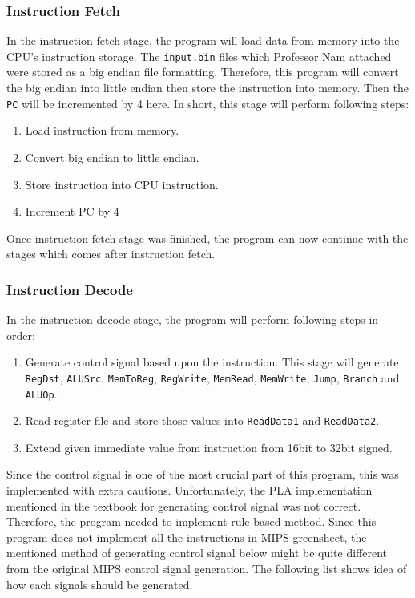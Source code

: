 \documentclass{homework}
\begin{document}
\subsubsection{Instruction Fetch}
In the instruction fetch stage, the program will load data from memory into the CPU's instruction storage. The \texttt{input.bin} files which Professor Nam attached were stored as a big endian file formatting. Therefore, this program will convert the big endian into little endian then store the instruction into memory. Then the \texttt{PC} will be incremented by 4 here. In short, this stage will perform following steps:
\begin{enumerate}
    \item Load instruction from memory.
    \item Convert big endian to little endian.
    \item Store instruction into CPU instruction.
    \item Increment PC by 4
\end{enumerate}
Once instruction fetch stage was finished, the program can now continue with the stages which comes after instruction fetch.
\pagebreak
\subsubsection{Instruction Decode}
In the instruction decode stage, the program will perform following steps in order:
\begin{enumerate}
    \item Generate control signal based upon the instruction. This stage will generate \texttt{RegDst}, \texttt{ALUSrc}, \texttt{MemToReg}, \texttt{RegWrite}, \texttt{MemRead}, \texttt{MemWrite}, \texttt{Jump}, \texttt{Branch} and \texttt{ALUOp}.
    \item Read register file and store those values into \texttt{ReadData1} and \texttt{ReadData2}.
    \item Extend given immediate value from instruction from 16bit to 32bit signed.
\end{enumerate}

Since the control signal is one of the most crucial part of this program, this was implemented with extra cautions. Unfortunately, the PLA implementation mentioned in the textbook for generating control signal was not correct. Therefore, the program needed to implement rule based method. Since this program does not implement all the instructions in MIPS greensheet, the mentioned method of generating control signal below might be quite different from the original MIPS control signal generation. The following list shows idea of how each signals should be generated.
\end{document}
